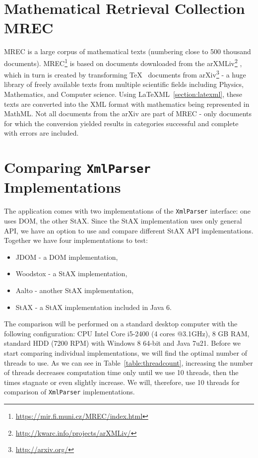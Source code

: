 \documentclass[11pt,oneside,final]{fithesis2}
\begin{document}
\section{Mathematical Retrieval Collection MREC}
\label{section:mrec}
MREC \cite{mrec:mrec2011} is a large corpus of mathematical texts (numbering close to 500 thousand documents). MREC\footnote{\url{https://mir.fi.muni.cz/MREC/index.html}} is based on documents downloaded from the arXMLiv\footnote{\url{http://kwarc.info/projects/arXMLiv/}} \cite{mrec:arXMLiv2010}, which in turn is created by transforming \TeX~ documents from arXiv\footnote{\url{http://arxiv.org/}} - a huge library of freely available texts from multiple scientific fields including Physics, Mathematics, and Computer science. Using \LaTeX ML~\ref{section:latexml}, these texts are converted into the XML format with mathematics being represented in MathML. Not all documents from the arXiv are part of MREC - only documents for which the conversion yielded results in categories successful and complete with errors are included.


\section{Comparing \texttt{XmlParser} Implementations}
\label{section:compareparsers}
The application comes with two implementations of the \texttt{XmlParser} interface: one uses DOM, the other StAX. Since the StAX implementation uses only general API, we have an option to use and compare different StAX API implementations. Together we have four implementations to test:
\begin{itemize}
\item JDOM - a DOM implementation,
\item Woodstox - a StAX implementation,
\item Aalto - another StAX implementation,
\item StAX - a StAX implementation included in Java 6.
\end{itemize} 

The comparison will be performed on a standard desktop computer with the following configuration: CPU Intel Core i5-2400 (4 cores @3.1GHz), 8 GB RAM, standard HDD (7200 RPM) with Windows 8 64-bit and Java 7u21. Before we start comparing individual implementations, we will find the optimal number of threads to use. As we can see in Table~\ref{table:threadcount}, increasing the number of threads decreases computation time only until we use 10 threads, then the times stagnate or even slightly increase. We will, therefore, use 10 threads for comparison of \texttt{XmlParser} implementations.
\end{document}
